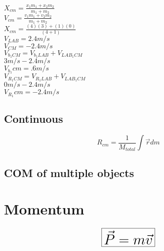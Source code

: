 \documentclass{article}
\begin{document}
            \begingroup 
                \large
                \begin{center}
                    $X_{cm} = \frac{x_1m_1+x_2m_2}{m_1 + m_2 }$\\[15pt]
                    $V_{cm} = \frac{v_1m_1+v_2m_2}{m_1 + m_2 }$\\[15pt]

                    $X_{cm} = \frac{(4)(3) + (1)(0)}{(4 + 1)}$\\[15pt]
                    
                    $V_{LAB} = 2.4 m/s$ \\
                    $V_{CM} = -2.4 m/s$ \\[10pt]

                    $V_{b_1CM} = V_{b_1LAB} + V_{LAB_1CM}$\\
                    $ 3m/s - 2.4m/s$\\
                    $V_{b_1}cm = .6m/s$\\[10pt]

                    $V_{R_1CM} = V_{R_1LAB} + V_{LAB_1CM}$\\
                    $ 0m/s - 2.4m/s$\\
                    $V_{R_1}cm = -2.4m/s$\\

                \end{center}
                
                
                
            \endgroup
     
        \pagebreak



        \subsection{Continuous}
        \[R_{cm} = \frac{1}{M_{total}} \int \vec{r}dm\]

        \subsection{COM of multiple objects}


    \pagebreak
    \section{\huge Momentum}
    \hrulefill
    \begin{equation}
        \huge
        \boxed{\vec{P} = m\vec{v}}
    \end{equation}
\end{document}
